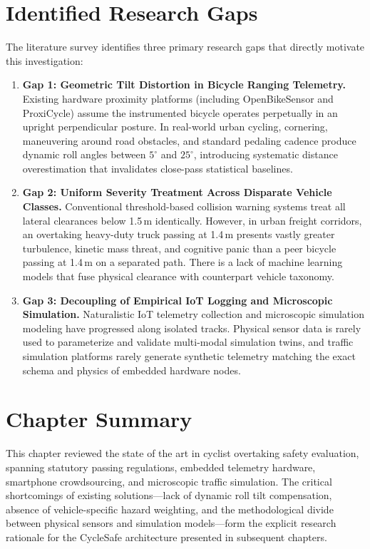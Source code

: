 \section{Identified Research Gaps}
The literature survey identifies three primary research gaps that directly motivate this investigation:
\begin{enumerate}
    \item \textbf{Gap 1: Geometric Tilt Distortion in Bicycle Ranging Telemetry.} Existing hardware proximity platforms (including OpenBikeSensor and ProxiCycle) assume the instrumented bicycle operates perpetually in an upright perpendicular posture. In real-world urban cycling, cornering, maneuvering around road obstacles, and standard pedaling cadence produce dynamic roll angles between $5^\circ$ and $25^\circ$, introducing systematic distance overestimation that invalidates close-pass statistical baselines.
    \item \textbf{Gap 2: Uniform Severity Treatment Across Disparate Vehicle Classes.} Conventional threshold-based collision warning systems treat all lateral clearances below 1.5\,m identically. However, in urban freight corridors, an overtaking heavy-duty truck passing at 1.4\,m presents vastly greater turbulence, kinetic mass threat, and cognitive panic than a peer bicycle passing at 1.4\,m on a separated path. There is a lack of machine learning models that fuse physical clearance with counterpart vehicle taxonomy.
    \item \textbf{Gap 3: Decoupling of Empirical IoT Logging and Microscopic Simulation.} Naturalistic IoT telemetry collection and microscopic simulation modeling have progressed along isolated tracks. Physical sensor data is rarely used to parameterize and validate multi-modal simulation twins, and traffic simulation platforms rarely generate synthetic telemetry matching the exact schema and physics of embedded hardware nodes.
\end{enumerate}

\section{Chapter Summary}
This chapter reviewed the state of the art in cyclist overtaking safety evaluation, spanning statutory passing regulations, embedded telemetry hardware, smartphone crowdsourcing, and microscopic traffic simulation. The critical shortcomings of existing solutions---lack of dynamic roll tilt compensation, absence of vehicle-specific hazard weighting, and the methodological divide between physical sensors and simulation models---form the explicit research rationale for the CycleSafe architecture presented in subsequent chapters.
